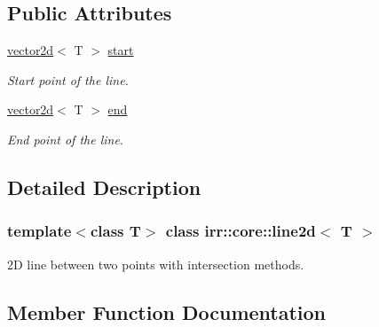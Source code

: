 \subsection*{Public Attributes}
\begin{DoxyCompactItemize}
\item 
\mbox{\label{classirr_1_1core_1_1line2d_a1d8c9b41f3c8d9c352deb5160f100c65}} 
\hyperlink{classirr_1_1core_1_1vector2d}{vector2d}$<$ T $>$ \hyperlink{classirr_1_1core_1_1line2d_a1d8c9b41f3c8d9c352deb5160f100c65}{start}
\begin{DoxyCompactList}\small\item\em Start point of the line. \end{DoxyCompactList}\item 
\mbox{\label{classirr_1_1core_1_1line2d_ab5708ad88b14fb601450e9c8765a613d}} 
\hyperlink{classirr_1_1core_1_1vector2d}{vector2d}$<$ T $>$ \hyperlink{classirr_1_1core_1_1line2d_ab5708ad88b14fb601450e9c8765a613d}{end}
\begin{DoxyCompactList}\small\item\em End point of the line. \end{DoxyCompactList}\end{DoxyCompactItemize}


\subsection{Detailed Description}
\subsubsection*{template$<$class T$>$\newline
class irr\+::core\+::line2d$<$ T $>$}

2D line between two points with intersection methods. 

\subsection{Member Function Documentation}
\mbox{\label{classirr_1_1core_1_1line2d_a0342a0b17c9318cb1eb1183cb91abaf4}} 
